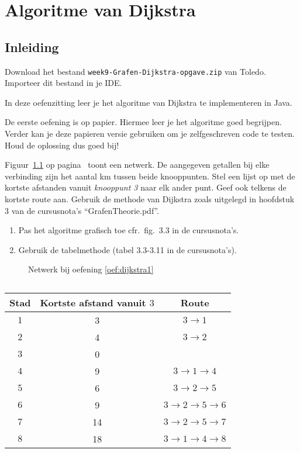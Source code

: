 
\chapter{Algoritme van Dijkstra}

\section*{Inleiding}
Download het bestand \verb/week9-Grafen-Dijkstra-opgave.zip/ van Toledo. Importeer dit bestand in je IDE.

In deze oefenzitting leer je het algoritme van Dijkstra te implementeren in Java.

De eerste oefening is op papier. Hiermee leer je het algoritme goed begrijpen. Verder kan je deze papieren versie gebruiken om je zelfgeschreven code te testen. Houd de oplossing dus goed bij!

\begin{oef}
\label{oef:dijkstra1}
\papier Figuur~\ref{fig:oefDijkstra1} op pagina~\pageref{fig:oefDijkstra1} toont een netwerk. De aangegeven getallen bij
elke verbinding zijn het aantal km tussen beide knooppunten. Stel
een lijst op met de kortste afstanden vanuit \emph{knooppunt 3} naar elk ander
punt. Geef ook telkens de kortste route aan. Gebruik de methode van Dijkstra zoals uitgelegd in hoofdstuk 3 van de cursusnota's ``GrafenTheorie.pdf''.
\begin{enumerate}
\item Pas het algoritme grafisch toe cfr.\ fig.\ 3.3 in de cursusnota's.
\item Gebruik de tabelmethode (tabel 3.3-3.11 in de cursusnota's).
\end{enumerate}
\begin{figure}[htbp]
     \centering

     \caption{Netwerk bij oefening \ref{oef:dijkstra1}}
     \label{fig:oefDijkstra1}
\end{figure}
\begin{opl}
$\quad$\\
$\quad$\\
\begin{tabular}{ccc}
\toprule
Stad & Kortste afstand vanuit $3$ & Route \\
\midrule
$1$ & 3 & $3\rightarrow 1$ \\
\midrule
$2$ & 4 & $3\rightarrow 2$ \\
\midrule
$3$ & 0 \\
\midrule
$4$ & 9&$3\rightarrow 1 \rightarrow 4$ \\
\midrule
$5$ & 6 & $3\rightarrow 2 \rightarrow 5$\\
\midrule
$6$ & 9 & $3\rightarrow 2 \rightarrow 5 \rightarrow 6$ \\
\midrule
$7$ & 14 & $3 \rightarrow 2 \rightarrow 5 \rightarrow 7$ \\
\midrule
$8$ & 18 & $3 \rightarrow 1 \rightarrow 4 \rightarrow 8$ \\
\bottomrule
\end{tabular}
\end{opl}
\end{oef}


